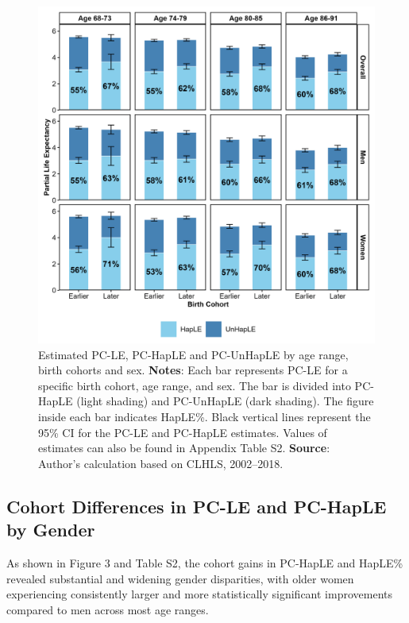 \documentclass[12pt, a4paper]{article}
\begin{document}
\begin{figure}[!p]
  \centering
  \includegraphics[width=1\textwidth]{fig_tabs_b300/2_2_HapLE_stacked_plots_sex.png}
  \caption{Estimated PC-LE, PC-HapLE and PC-UnHapLE by age range, birth cohorts and sex. \textbf{Notes}: Each bar represents PC-LE for a specific birth cohort, age range, and sex. The bar is divided into PC-HapLE (light shading) and PC-UnHapLE (dark shading). The figure inside each bar indicates HapLE\%. Black vertical lines represent the 95\% CI for the PC-LE and PC-HapLE estimates. Values of estimates can also be found in Appendix Table S2. \textbf{Source}: Author's calculation based on CLHLS, 2002–2018.}
\end{figure}

\subsection{Cohort Differences in PC-LE and PC-HapLE by Gender}

As shown in Figure 3 and Table S2, the cohort gains in PC-HapLE and HapLE\% revealed substantial and widening gender disparities, with older women experiencing consistently larger and more statistically significant improvements compared to men across most age ranges.
\end{document}
